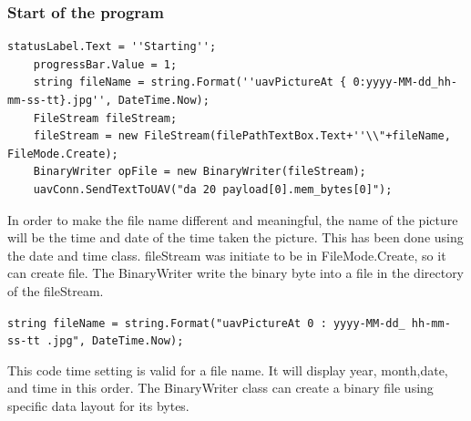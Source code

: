 \documentclass[oneside]{ecsgdp}         %
\begin{document}
\subsubsection*{Start of the program}



\begin{lstlisting}[caption={Start of the program}, label=lst:payload_shared_mem_set]
	statusLabel.Text = ''Starting'';   
	progressBar.Value = 1;   
	string fileName = string.Format(''uavPictureAt { 0:yyyy-MM-dd_hh-mm-ss-tt}.jpg'', DateTime.Now);
	FileStream fileStream;
	fileStream = new FileStream(filePathTextBox.Text+''\\"+fileName, FileMode.Create);      
	BinaryWriter opFile = new BinaryWriter(fileStream);
	uavConn.SendTextToUAV("da 20 payload[0].mem_bytes[0]");      
 \end{lstlisting}
             In order to make the file name different and meaningful, the name of the picture will be the time and date of the time taken the picture. This has been done using the date and time class. fileStream was initiate to be in FileMode.Create, so it can create file. The BinaryWriter write the binary byte into a file in the directory of the fileStream. 
            
\texttt{string fileName = string.Format("uavPictureAt{ 0 : yyyy-MM-dd\_ hh-mm-ss-tt}
 .jpg", DateTime.Now);   }  
        
            This code time setting is valid for a file name. It will display year, month,date, and time in this order. The BinaryWriter class can create a binary file using specific data layout for its bytes. 
\end{document}
